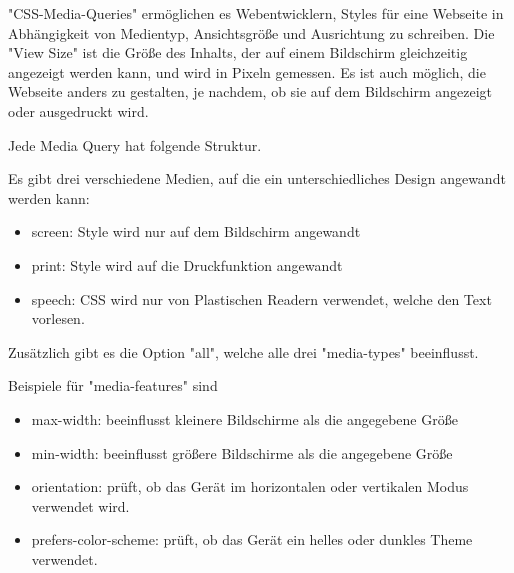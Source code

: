 \label{sec:mediaQueries}

"CSS-Media-Queries" ermöglichen es Webentwicklern, Styles für eine Webseite in Abhängigkeit von Medientyp, Ansichtsgröße und Ausrichtung zu schreiben. 
Die "View Size" ist die Größe des Inhalts, der auf einem Bildschirm gleichzeitig angezeigt werden kann, und wird in Pixeln gemessen. 
Es ist auch möglich, die Webseite anders zu gestalten, je nachdem, ob sie auf dem Bildschirm angezeigt oder ausgedruckt wird. 

\begin{minipage}{\textwidth}
    Jede Media Query hat folgende Struktur. 
    
\end{minipage}

Es gibt drei verschiedene Medien, auf die ein unterschiedliches Design angewandt werden kann: 
\begin{itemize}
    \item screen: Style wird nur auf dem Bildschirm angewandt
    \item print: Style wird auf die Druckfunktion angewandt 
    \item speech: CSS wird nur von Plastischen Readern verwendet, welche den Text vorlesen. 
\end{itemize}

Zusätzlich gibt es die Option "all", welche alle drei "media-types" beeinflusst. \cite{w3MediaQueries}

Beispiele für "media-features" sind

\begin{itemize}
    \item max-width: beeinflusst kleinere Bildschirme als die angegebene Größe
    \item min-width: beeinflusst größere Bildschirme als die angegebene Größe 
    \item orientation: prüft, ob das Gerät im horizontalen oder vertikalen Modus verwendet wird.
    \item prefers-color-scheme: prüft, ob das Gerät ein helles oder dunkles Theme verwendet.
\end{itemize}
